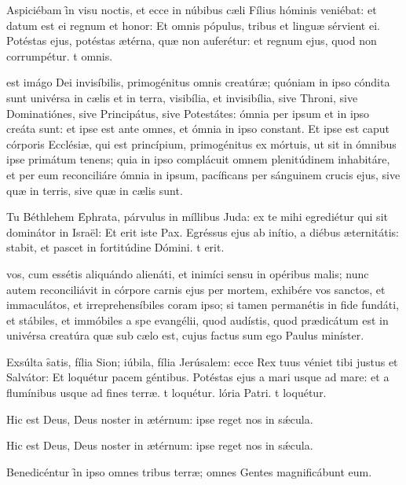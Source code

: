 \documentclass[fontsize=8pt,paper=A6,twoside,BCOR=1mm,DIV=22,headinclude]{scrarticle}
\begin{document}
\begin{multicols}{2}
{\R Aspiciébam \f in visu noctis, et ecce in núbibus cæli Fílius hóminis veniébat: et datum est ei regnum et honor:
\red{*} Et omnis pópulus, tribus et linguæ sérvient ei.
\V Potéstas ejus, potéstas ætérna, quæ non auferétur: et regnum ejus, quod non corrumpétur.
t omnis.

}

 est imágo Dei invisíbilis, primogénitus omnis creatúræ; quóniam in ipso cóndita sunt univérsa in cælis et in terra, visibília, et invisibília, sive Throni, sive Dominatiónes, sive Principátus, sive Potestátes: ómnia per ipsum et in ipso creáta sunt: et ipse est ante omnes, et ómnia in ipso constant. Et ipse est caput córporis Ecclésiæ, qui est princípium, primogénitus ex mórtuis, ut sit in ómnibus ipse primátum tenens; quia in ipso complácuit omnem plenitúdinem inhabitáre, et per eum reconciliáre ómnia in ipsum, pacíficans per sánguinem crucis ejus, sive quæ in terris, sive quæ in cælis sunt.

\R Tu Béthlehem \f Ephrata, párvulus in míllibus Juda: ex te mihi egrediétur qui sit dominátor in Israël:
\red{*} Et erit iste Pax.
\V Egréssus ejus ab inítio, a diébus æternitátis: stabit, et pascet in fortitúdine Dómini.
t erit.

 vos, cum essétis aliquándo alienáti, et inimíci sensu in opéribus malis; nunc autem reconciliávit in córpore carnis ejus per mortem, exhibére vos sanctos, et immaculátos, et irreprehensíbiles coram ipso; si tamen permanétis in fide fundáti, et stábiles, et immóbiles a spe evangélii, quod audístis, quod prædicátum est in univérsa creatúra quæ sub cælo est, cujus factus sum ego Paulus miníster.

\R Exsúlta \f satis, fília Sion; iúbila, fília Jerúsalem: ecce Rex tuus véniet tibi justus et Salvátor:
\red{*} Et loquétur pacem géntibus.
\V Potéstas ejus a mari usque ad mare: et a flumínibus usque ad fines terræ.
t loquétur.
lória Patri.
t loquétur.


\A Hic est Deus, \f Deus noster in ætérnum: ipse reget nos in sǽcula.

\columnbreak

{


\A Hic est Deus, Deus noster in ætérnum: ipse reget nos in sǽcula.

\A Benedicéntur \f in ipso omnes tribus terræ; omnes Gentes magnificábunt eum.

}
\end{multicols}
\end{document}
